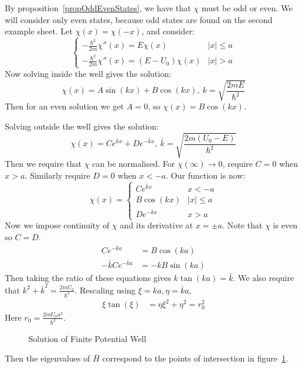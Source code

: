 \documentclass[../Main.tex]{subfiles}
\begin{document}
By proposition~\ref{propOddEvenStates}, we have that $\chi$ must be odd or even. We will consider only even states, because odd states are found on the second example sheet. Let $\chi(x) = \chi(-x)$, and consider:
\begin{equation*}
    \begin{cases}
        -\frac{\hbar^2}{2m}\chi''(x) = E\chi(x) & |x| \leq a \\
        -\frac{\hbar^2}{2m}\chi''(x) = (E - U_0)\chi(x) & |x| > a
    \end{cases}
\end{equation*}
Now solving inside the well gives the solution:
\begin{equation*}
    \chi(x) = A\sin(kx) + B\cos(kx),~k = \sqrt{\frac{2mE}{\hbar^2}}
\end{equation*}
Then for an even solution we get $A = 0$, so $\chi(x) = B\cos(kx)$.

Solving outside the well gives the solution:
\begin{equation*}
    \chi(x) = Ce^{\bar{k}x} + De^{-\bar{k}x},~\bar{k} = \sqrt{\frac{2m(U_0 - E)}{\hbar^2}} 
\end{equation*}
Then we require that $\chi$ can be normalised. For $\chi(\infty) \to 0$, require $C = 0$ when $x > a$. Similarly require $D = 0$ when $x < -a$. Our function is now:
\begin{equation*}
    \chi(x) =
    \begin{cases}
        Ce^{\bar{k}x} & x < -a \\
        B\cos(kx) & |x| \leq a \\
        De^{-\bar{k}x} & x > a
    \end{cases}
\end{equation*}
Now we impose continuity of $\chi$ and its derivative at $x = \pm a$. Note that $\chi$ is even so $C = D$.
\begin{align}
    Ce^{-\bar{k}a} &= B\cos(ka) \label{eqnFPWellEqns} \\
    -\bar{k} C e^{-\bar{k}a} &= -kB\sin(ka) \nonumber
\end{align}
Then taking the ratio of these equations gives $k\tan(ka) = \bar{k}$. We also require that $k^2 + \bar{k}^2 = \frac{2mU_0}{\hbar^2}$. Rescaling using $\xi = ka, \eta = \bar{k} a$,
\begin{align*}
    \xi \tan(\xi) &= \eta
    \xi^2 + \eta^2 = r_0^2
\end{align*}
Here $r_0 = \frac{2mU_0a^2}{\hbar^2}$.
\begin{figure}
    \centering
    \begin{tikzpicture}[scale=0.5]
    \end{tikzpicture}
    \caption{Solution of Finite Potential Well}
    \label{figFPWellSoln}
\end{figure}
Then the eigenvalues of $\bar{H}$ correspond to the points of intersection in figure~\ref{figFPWellSoln}.
\end{document}
